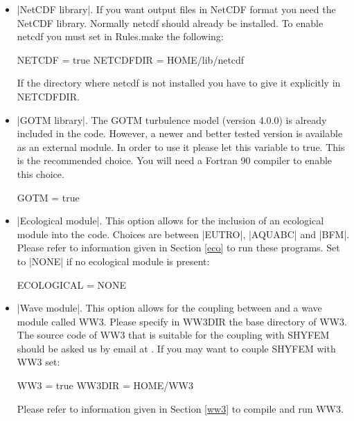 \begin{itemize}
To use PETSC try to compile:
\begin{code}
	cd shyfem (or wherever your shyfem installation is)
	make cleanall
	make rules_std rules_petsc
	make fem
\end{code}

if you get a message that PETSC$\_$DIR is not in the library path run:\\

	export LD$\_$LIBRARY$\_$PATH=$\$$LD$\_$LIBRARY$\_$PATH:$\$$HOME/lib/petsc/lib \\

	this command should be inserted into .profile or .bashrc because this message will also appear every time you run shyfem\\

try to run shyfem:
\begin{code}
	mpirun -np 4 path_to_shyfem/shyfem str-file.str
\end{code}

\item |NetCDF library|. If you want output files in NetCDF format
you need the NetCDF library. Normally netcdf should already be installed. To enable netcdf you
must set in Rules.make the following:
\begin{codem}
NETCDF = true
NETCDFDIR = HOME/lib/netcdf
\end{codem}

If the directory where netcdf is not installed you have to give it
explicitly in NETCDFDIR.


\item |GOTM library|. The GOTM turbulence model (version 4.0.0) is already included in
the code. However, a newer and better tested version is available as an
external module. In order to use it please let this variable to true. This
is the recommended choice. You will need a Fortran 90 compiler to enable
this choice.
\begin{codem}
GOTM = true
\end{codem}

\item |Ecological module|. This option allows for the inclusion of an
ecological module into the code. Choices are between |EUTRO|, |AQUABC| and |BFM|. Please refer to information given in Section \ref{eco}
to run these programs. Set to |NONE| if no ecological module is present:
\begin{codem}
ECOLOGICAL = NONE
\end{codem}

\item |Wave module|. This option allows for the coupling between \shy{} and a wave module called WW3. Please specify in WW3DIR the base directory of WW3. The source code of WW3 that is suitable for the coupling with SHYFEM should be asked us by email at . If you may want to couple SHYFEM with WW3 set:
\begin{codem}
WW3 = true
WW3DIR = HOME/WW3
\end{codem}
Please refer to information given in Section \ref{ww3}
to compile and run WW3.

\end{itemize}

